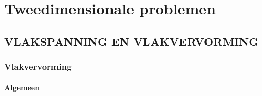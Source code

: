 \chapter{Tweedimensionale problemen}

    \section{VLAKSPANNING EN VLAKVERVORMING}

        \subsection{Vlakvervorming}

            \subsubsection{Algemeen}

